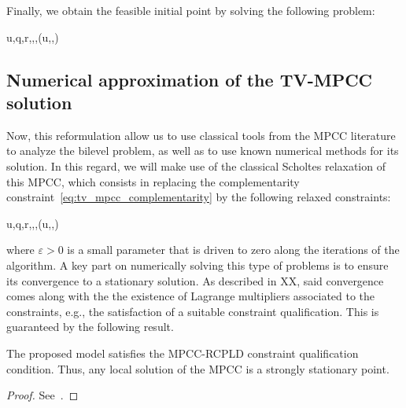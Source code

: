 \documentclass[review,onefignum,onetabnum]{siamonline190516}
\newcommand{\Jcal}{\mathcal{J}}
\newcommand{\Dcal}{\mathcal{D}}
\begin{document}
Finally, we obtain the feasible initial point by solving the following problem:
\begin{mini!}
  {u,q,r,\delta,\theta,\alpha}{\Jcal(u,\alpha,\sigma)}{}{}
  \addConstraint{\nabla \Dcal(u)+\mathbb{K}^\ast q + \mathbb{B}^\ast}{c=0}
\end{mini!}



\subsection{Numerical approximation of the TV-MPCC solution}

Now, this reformulation allow us to use classical tools from the MPCC literature to analyze the bilevel problem, as well as to use known numerical methods for its solution. In this regard, we will make use of the classical Scholtes relaxation of this MPCC, which consists in replacing the complementarity constraint~\eqref{eq:tv_mpcc_complementarity} by the following relaxed constraints:
\begin{mini!}
  {u,q,r,\delta,\theta,\alpha}{\Jcal(u,\alpha,\sigma)}{\label{eq:mpcc_relaxation}}{}
  \addConstraint{\nabla \Dcal(u)+\mathbb{K}^\ast q + \mathbb{B}^\ast c =0}
\end{mini!}
where $\varepsilon>0$ is a small parameter that is driven to zero along the iterations of the algorithm. A key part on numerically solving this type of problems is to ensure its convergence to a stationary solution. As described in XX, said convergence comes along with the the existence of Lagrange multipliers associated to the constraints, e.g., the satisfaction of a suitable constraint qualification. This is guaranteed by the following result.

\begin{theorem}
The proposed model satisfies the MPCC-RCPLD constraint qualification condition. Thus, any local solution of the MPCC is a strongly stationary point.
\end{theorem}
\begin{proof}
  See~\cite[Theorem 3.4]{de2023bilevel}.
\end{proof}
\end{document}
